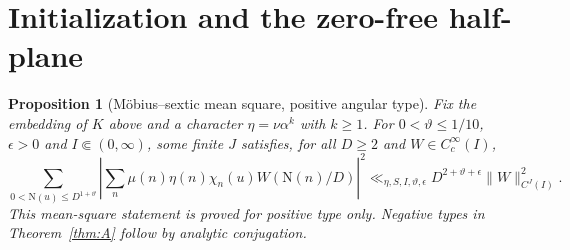 \documentclass[11pt,a4paper]{article}
\numberwithin{equation}{section}
\newtheorem{proposition}[theorem]{Proposition}
\theoremstyle{definition}
\theoremstyle{remark}
\newcommand{\N}{\mathrm N}
\begin{document}
\section{Initialization and the zero-free half-plane}\label{sec:mainproof}
\begin{proposition}[M\"obius--sextic mean square, positive angular type]\label{prop:mobius}
Fix the embedding of $K$ above and a character $\eta=\nu\alpha^k$ with $k\ge1$. For $0<\vartheta\le1/10$, $\epsilon>0$ and $I\Subset(0,\infty)$, some finite $J$ satisfies, for all $D\ge2$ and $W\in C_c^\infty(I)$,
\begin{equation}\label{eq:mobiusbound}
 \sum_{0<\N(u)\le D^{1+\vartheta}}
 \left|\sum_n\mu(n)\eta(n)\chi_n(u)W(\N(n)/D)\right|^2
 \ll_{\eta,S,I,\vartheta,\epsilon}D^{2+\vartheta+\epsilon}\|W\|_{C^J(I)}^2.
\end{equation}
This mean-square statement is proved for positive type only. Negative types in Theorem~\ref{thm:A} follow by analytic conjugation.
\end{proposition}
\end{document}
